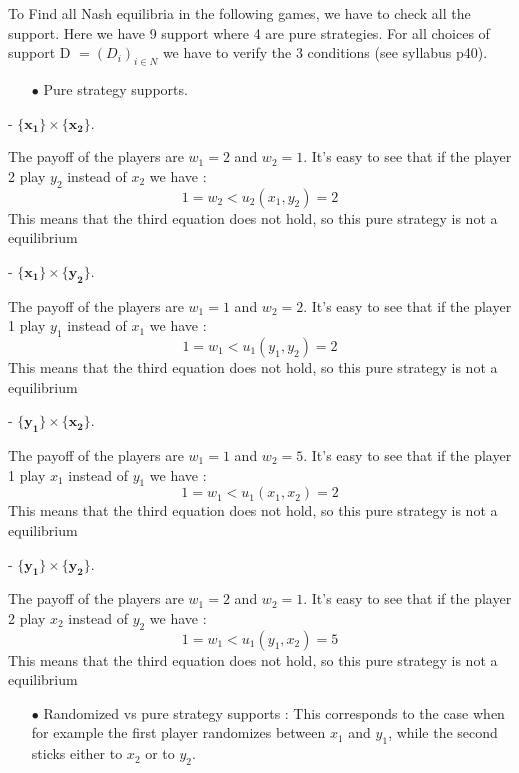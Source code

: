 To Find all Nash equilibria in the following games, we have to check all the support. Here we have 9 support where 4 are pure strategies. For all choices of support D $= (D_i)_{i\in N}$ we have to verify the 3 conditions (see syllabus p40).

\begin{itemize}
  \item[$\bullet$] Pure strategy supports. 
\end{itemize}

- $\mathbf{\{x_1\}}\times\mathbf{\{x_2\}}$.

The payoff of the players are $w_1=2$ and $w_2=1$. It's easy to see that if the player 2 play $y_2$ instead of $x_2$ we have :
\begin{equation*}
    1=w_2<u_2(x_1,y_2)=2
\end{equation*}
This means that the third equation does not hold, so this pure strategy is not a equilibrium 

- $\mathbf{\{x_1\}}\times\mathbf{\{y_2\}}$.

The payoff of the players are $w_1=1$ and $w_2=2$. It's easy to see that if the player 1 play $y_1$ instead of $x_1$ we have :
\begin{equation*}
    1=w_1<u_1(y_1,y_2)=2
\end{equation*}
This means that the third equation does not hold, so this pure strategy is not a equilibrium 

- $\mathbf{\{y_1\}}\times\mathbf{\{x_2\}}$.

The payoff of the players are $w_1=1$ and $w_2=5$. It's easy to see that if the player 1 play $x_1$ instead of $y_1$ we have :
\begin{equation*}
    1=w_1<u_1(x_1,x_2)=2
\end{equation*}
This means that the third equation does not hold, so this pure strategy is not a equilibrium 

- $\mathbf{\{y_1\}}\times\mathbf{\{y_2\}}$.

The payoff of the players are $w_1=2$ and $w_2=1$. It's easy to see that if the player 2 play $x_2$ instead of $y_2$ we have :
\begin{equation*}
    1=w_1<u_1(y_1,x_2)=5
\end{equation*}
This means that the third equation does not hold, so this pure strategy is not a equilibrium 


\begin{itemize}
  \item[$\bullet$] Randomized vs pure strategy supports : This corresponds to the case when for example the first player randomizes between $x_1$ and $y_1$, while the second sticks either to $x_2$ or to $y_2$.
\end{itemize}


